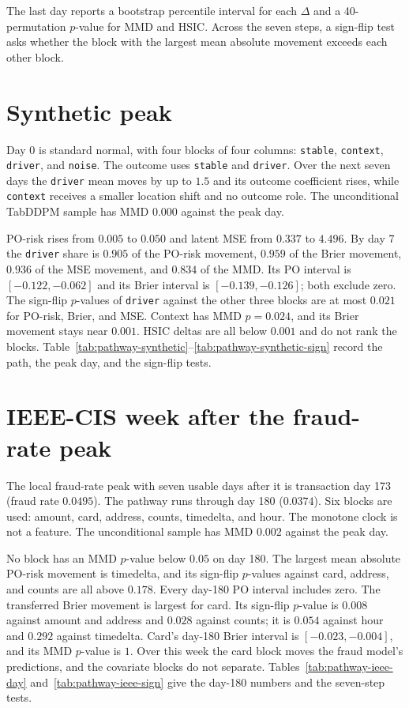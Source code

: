 \documentclass[11pt]{article}
\begin{document}
The last day reports a bootstrap percentile interval for each \(\Delta\) and
a 40-permutation \(p\)-value for MMD and HSIC. Across the seven steps, a
sign-flip test asks whether the block with the largest mean absolute
movement exceeds each other block.

\section{Synthetic peak}

Day 0 is standard normal, with four blocks of four columns: \texttt{stable},
\texttt{context}, \texttt{driver}, and \texttt{noise}. The outcome uses
\texttt{stable} and \texttt{driver}. Over the next seven days the
\texttt{driver} mean moves by up to \(1.5\) and its outcome coefficient
rises, while \texttt{context} receives a smaller location shift and no
outcome role. The unconditional TabDDPM sample has MMD \(0.000\) against
the peak day.

PO-risk rises from \(0.005\) to \(0.050\) and latent MSE from \(0.337\) to
\(4.496\). By day 7 the \texttt{driver} share is \(0.905\) of the PO-risk
movement, \(0.959\) of the Brier movement, \(0.936\) of the MSE movement,
and \(0.834\) of the MMD. Its PO interval is \([-0.122,-0.062]\) and its
Brier interval is \([-0.139,-0.126]\); both exclude zero. The sign-flip
\(p\)-values of \texttt{driver} against the other three blocks are at most
\(0.021\) for PO-risk, Brier, and MSE. Context has MMD \(p=0.024\), and its
Brier movement stays near \(0.001\). HSIC deltas are all below \(0.001\)
and do not rank the blocks.
Table~\ref{tab:pathway-synthetic}--\ref{tab:pathway-synthetic-sign} record
the path, the peak day, and the sign-flip tests.

\section{IEEE-CIS week after the fraud-rate peak}

The local fraud-rate peak with seven usable days after it is transaction
day 173 (fraud rate \(0.0495\)). The pathway runs through day 180
(\(0.0374\)). Six blocks are used: amount, card, address, counts,
timedelta, and hour. The monotone clock is not a feature. The unconditional
sample has MMD \(0.002\) against the peak day.

No block has an MMD \(p\)-value below \(0.05\) on day 180. The largest mean
absolute PO-risk movement is timedelta, and its sign-flip \(p\)-values
against card, address, and counts are all above \(0.178\). Every day-180 PO
interval includes zero. The transferred Brier movement is largest for card.
Its sign-flip \(p\)-value is \(0.008\) against amount and address and
\(0.028\) against counts; it is \(0.054\) against hour and \(0.292\) against
timedelta. Card's day-180 Brier interval is \([-0.023,-0.004]\), and its
MMD \(p\)-value is \(1\). Over this week the card block moves the fraud
model's predictions, and the covariate blocks do not separate.
Tables~\ref{tab:pathway-ieee-day} and~\ref{tab:pathway-ieee-sign} give the
day-180 numbers and the seven-step tests.
\end{document}
